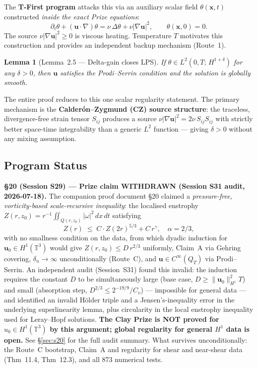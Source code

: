 \documentclass[11pt, a4paper]{article}
\newtheorem{lemma}[theorem]{Lemma}
\theoremstyle{definition}
\theoremstyle{remark}
\newcommand{\thet}{\theta}
\newcommand{\delt}{\delta}
\newcommand{\LtHs}[1]{L^2(0,T;\,H^{#1})}
\begin{document}
The \textbf{T-First program} attacks this via an auxiliary scalar field
$\thet(\mathbf{x},t)$ constructed \emph{inside the exact Prize equations}:
\begin{equation}
  \partial_t\thet + (\mathbf{u}\cdot\nabla)\thet
    = \nu\,\Delta\thet + \nu|\nabla\mathbf{u}|^2, \qquad \thet(\mathbf{x},0) = 0.
  \label{eq:theta}
\end{equation}
The source $\nu|\nabla\mathbf{u}|^2 \geq 0$ is viscous heating. Temperature $T$ motivates
this construction and provides an independent backup mechanism (Route~1).

\begin{lemma}[Lemma~2.5 --- Delta-gain closes LPS]
  If $\thet \in \LtHs{1+\delt}$ for any $\delt > 0$, then $\mathbf{u}$
  satisfies the Prodi--Serrin condition and the solution is globally smooth.
\end{lemma}

\noindent The entire proof reduces to this one scalar regularity statement.
The primary mechanism is the \textbf{Calder\'on--Zygmund (CZ) source structure}:
the traceless, divergence-free strain tensor $S_{ij}$ produces a source
$\nu|{\nabla\mathbf{u}}|^2 = 2\nu\,S_{ij}S_{ij}$ with strictly better space-time
integrability than a generic $L^2$ function --- giving $\delt > 0$ without any
mixing assumption.

\subsection{Program Status}

\begin{tcolorbox}[colback=failred!6, colframe=failred!70!black, breakable]
\textbf{\S20 (Session S29) --- Prize claim WITHDRAWN (Session S31 audit, 2026-07-18).}
The companion proof document \S20 claimed a \emph{pressure-free, vorticity-based
scale-recursive inequality}: the localised enstrophy
$Z(r,z_0) = r^{-1}\iint_{Q(r,z_0)}|\omega|^2\,dx\,dt$
satisfying
\[
  Z(r) \;\leq\; C\cdot Z(2r)^{5/3} + C\,r^{\gamma}, \quad \alpha = 2/3,
\]
with no smallness condition on the data, from which dyadic induction for
$\mathbf{u}_0 \in H^1(\mathbb{T}^3)$ would give $Z(r,z_0)\leq D\,r^{2/3}$
uniformly, Claim~A via Gehring covering, $\delta_n\to\infty$ unconditionally
(Route~C), and $\mathbf{u}\in C^\infty(Q_T)$ via Prodi--Serrin.
An independent audit (Session~S31) found this invalid: the induction requires
the constant $D$ to be simultaneously large (base case, $D\geq\|\mathbf{u}_0\|_{H^1}^2T$)
and small (absorption step, $D^{2/3}\leq 2^{-19/9}/C_v$) --- impossible for
general data --- and identified an invalid H\"older triple and a
Jensen's-inequality error in the underlying superlinearity lemma, plus
circularity in the local enstrophy inequality used for Leray--Hopf solutions.
\textbf{The Clay Prize is NOT proved for $u_0\in H^1(\mathbb{T}^3)$ by this
argument; global regularity for general $H^1$ data is open.}
See §\ref{sec:s20} for the full audit summary.  What survives unconditionally:
the Route~C bootstrap, Claim~A and regularity for shear and near-shear data
(Thm~11.4, Thm~12.3), and all 873 numerical tests.
\end{tcolorbox}
\end{document}
